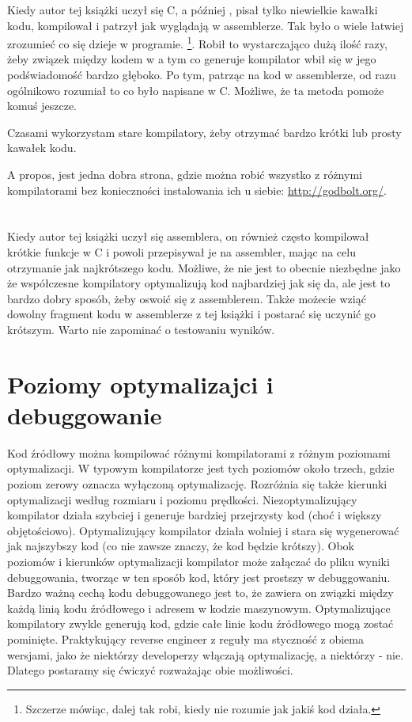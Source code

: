 
Kiedy autor tej książki uczył się C, a później \CCpp, pisał tylko niewielkie kawałki kodu, kompilował i patrzył jak wyglądają w assemblerze. Tak było o wiele łatwiej zrozumieć co się dzieje w programie.%
\footnote{Szczerze mówiąc, dalej tak robi, kiedy nie rozumie jak jakiś kod działa.}.
Robił to wystarczająco dużą ilość razy, żeby związek między kodem w \CCpp a tym co generuje kompilator wbił się w jego podświadomość bardzo głęboko. Po tym, patrząc na kod w assemblerze, od razu ogólnikowo rozumiał to co było napisane w C. Możliwe, że ta metoda pomoże komuś jeszcze.


Czasami wykorzystam stare kompilatory, żeby otrzymać bardzo krótki lub prosty kawałek kodu.

A propos, jest jedna dobra strona, gdzie można robić wszystko z różnymi kompilatorami bez konieczności instalowania ich u siebie: \url{http://godbolt.org/}.

\section*{\Exercises}

Kiedy autor tej książki uczył się assemblera, on również często kompilował krótkie funkcje w C i powoli przepisywał je na assembler, mając na celu otrzymanie jak najkrótszego kodu. Możliwe, że nie jest to obecnie niezbędne jako że współczesne kompilatory optymalizują kod najbardziej jak się da, ale jest to bardzo dobry sposób, żeby oswoić się z assemblerem. Także możecie wziąć dowolny fragment kodu w assemblerze z tej książki i postarać się uczynić go krótszym. Warto nie zapominać o testowaniu wyników.

\section*{Poziomy optymalizajci i debuggowanie}

Kod źródłowy można kompilować różnymi kompilatorami z różnym poziomami optymalizacji. W typowym kompilatorze jest tych poziomów około trzech, gdzie poziom zerowy oznacza wyłączoną optymalizację. Rozróżnia się także kierunki optymalizacji według rozmiaru i poziomu prędkości. Niezoptymalizujący kompilator działa szybciej i generuje bardziej przejrzysty kod (choć i większy objętościowo). Optymalizujący kompilator działa wolniej i stara się wygenerować jak najszybszy kod (co nie zawsze znaczy, że kod będzie krótszy). Obok poziomów i kierunków optymalizacji kompilator może załączać do pliku wyniki debuggowania, tworząc w ten sposób kod, który jest prostszy w debuggowaniu. Bardzo ważną cechą kodu debuggowanego jest to, że zawiera on związki między każdą linią kodu źródłowego i adresem w kodzie maszynowym. Optymalizujące kompilatory zwykle generują kod, gdzie całe linie kodu źródłowego mogą zostać pominięte. Praktykujący reverse engineer z reguły ma styczność z obiema wersjami, jako że niektórzy developerzy włączają optymalizację, a niektórzy - nie. Dlatego postaramy się ćwiczyć rozważając obie możliwości.

